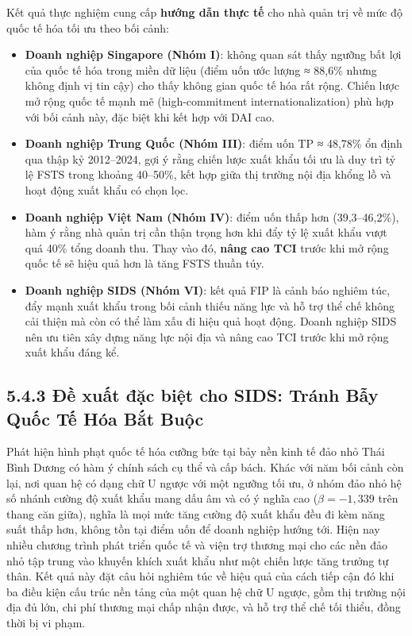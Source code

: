 \documentclass[
  a4paper,
  13pt]{extreport}
\begin{document}
Kết quả thực nghiệm cung cấp \textbf{hướng dẫn thực tế} cho nhà quản trị
về mức độ quốc tế hóa tối ưu theo bối cảnh:

\begin{itemize}
\item
  \textbf{Doanh nghiệp Singapore (Nhóm I)}: không quan sát thấy ngưỡng
  bất lợi của quốc tế hóa trong miền dữ liệu (điểm uốn ước lượng ≈
  88,6\% nhưng không định vị tin cậy) cho thấy không gian quốc tế hóa
  rất rộng. Chiến lược mở rộng quốc tế mạnh mẽ (high-commitment
  internationalization) phù hợp với bối cảnh này, đặc biệt khi kết hợp
  với DAI cao.
\item
  \textbf{Doanh nghiệp Trung Quốc (Nhóm III)}: điểm uốn TP ≈ 48,78\% ổn
  định qua thập kỷ 2012--2024, gợi ý rằng chiến lược xuất khẩu tối ưu là
  duy trì tỷ lệ FSTS trong khoảng 40--50\%, kết hợp giữa thị trường nội
  địa khổng lồ và hoạt động xuất khẩu có chọn lọc.
\item
  \textbf{Doanh nghiệp Việt Nam (Nhóm IV)}: điểm uốn thấp hơn
  (39,3--46,2\%), hàm ý rằng nhà quản trị cần thận trọng hơn khi đẩy tỷ
  lệ xuất khẩu vượt quá 40\% tổng doanh thu. Thay vào đó, \textbf{nâng
  cao TCI} trước khi mở rộng quốc tế sẽ hiệu quả hơn là tăng FSTS thuần
  túy.
\item
  \textbf{Doanh nghiệp SIDS (Nhóm VI)}: kết quả FIP là cảnh báo nghiêm
  túc, đẩy mạnh xuất khẩu trong bối cảnh thiếu năng lực và hỗ trợ thể
  chế không cải thiện mà còn có thể làm xấu đi hiệu quả hoạt động. Doanh
  nghiệp SIDS nên ưu tiên xây dựng năng lực nội địa và nâng cao TCI
  trước khi mở rộng xuất khẩu đáng kể.
\end{itemize}

\hypertarget{ux111ux1ec1-xuux1ea5t-ux111ux1eb7c-biux1ec7t-cho-sids-truxe1nh-bux1eaby-quux1ed1c-tux1ebf-huxf3a-bux1eaft-buux1ed9c}{%
\subsection{5.4.3 Đề xuất đặc biệt cho SIDS: Tránh Bẫy Quốc Tế Hóa Bắt
Buộc}\label{ux111ux1ec1-xuux1ea5t-ux111ux1eb7c-biux1ec7t-cho-sids-truxe1nh-bux1eaby-quux1ed1c-tux1ebf-huxf3a-bux1eaft-buux1ed9c}}

Phát hiện hình phạt quốc tế hóa cưỡng bức tại bảy nền kinh tế đảo nhỏ
Thái Bình Dương có hàm ý chính sách cụ thể và cấp bách. Khác với năm bối
cảnh còn lại, nơi quan hệ có dạng chữ U ngược với một ngưỡng tối ưu, ở
nhóm đảo nhỏ hệ số nhánh cường độ xuất khẩu mang dấu âm và có ý nghĩa
cao (\(\beta = -1{,}339\) trên thang căn giữa), nghĩa là mọi mức tăng
cường độ xuất khẩu đều đi kèm năng suất thấp hơn, không tồn tại điểm uốn
để doanh nghiệp hướng tới. Hiện nay nhiều chương trình phát triển quốc
tế và viện trợ thương mại cho các nền đảo nhỏ tập trung vào khuyến khích
xuất khẩu như một chiến lược tăng trưởng tự thân. Kết quả này đặt câu
hỏi nghiêm túc về hiệu quả của cách tiếp cận đó khi ba điều kiện cấu
trúc nền tảng của một quan hệ chữ U ngược, gồm thị trường nội địa đủ
lớn, chi phí thương mại chấp nhận được, và hỗ trợ thể chế tối thiểu,
đồng thời bị vi phạm.
\end{document}
